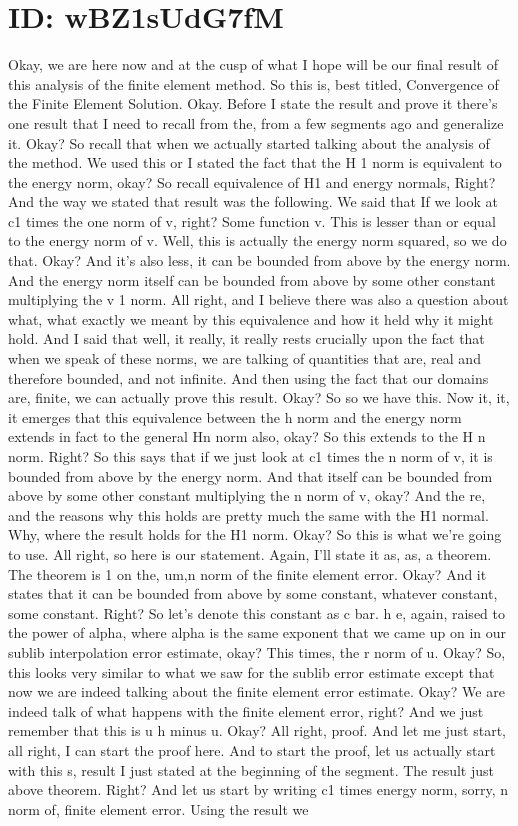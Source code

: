 \documentclass[10pt]{article}
\begin{document}
{\section*{ID: wBZ1sUdG7fM}
Okay, we are here now and at the cusp of what I hope will be our final result of this analysis of the finite element method. So this is, best titled, Convergence of the Finite Element Solution. Okay. Before I state the result and prove it there's one result that I need to recall from the, from a few segments ago and generalize it. Okay? So recall that when we actually started talking about the analysis of the method. We used this or I stated the fact that the H 1 norm is equivalent to the energy norm, okay? So recall equivalence of H1 and energy normals, Right? And the way we stated that result was the following. We said that If we look at c1 times the one norm of v, right? Some function v. This is lesser than or equal to the energy norm of v. Well, this is actually the energy norm squared, so we do that. Okay? And it's also less, it can be bounded from above by the energy norm. And the energy norm itself can be bounded from above by some other constant multiplying the v 1 norm. All right, and I believe there was also a question about what, what exactly we meant by this equivalence and how it held why it might hold. And I said that well, it really, it really rests crucially upon the fact that when we speak of these norms, we are talking of quantities that are, real and therefore bounded, and not infinite. And then using the fact that our domains are, finite, we can actually prove this result. Okay? So so we have this. Now it, it, it emerges that this equivalence between the h norm and the energy norm extends in fact to the general Hn norm also, okay? So this extends to the H n norm. Right? So this says that if we just look at c1 times the n norm of v, it is bounded from above by the energy norm. And that itself can be bounded from above by some other constant multiplying the n norm of v, okay? And the re, and the reasons why this holds are pretty much the same with the H1 normal. Why, where the result holds for the H1 norm. Okay? So this is what we're going to use. All right, so here is our statement. Again, I'll state it as, as, a theorem. The theorem is 1 on the, um,n norm of the finite element error. Okay? And it states that it can be bounded from above by some constant, whatever constant, some constant. Right? So let's denote this constant as c bar. h e, again, raised to the power of alpha, where alpha is the same exponent that we came up on in our sublib interpolation error estimate, okay? This times, the r norm of u. Okay? So, this looks very similar to what we saw for the sublib error estimate except that now we are indeed talking about the finite element error estimate. Okay? We are indeed talk of what happens with the finite element error, right? And we just remember that this is u h minus u. Okay? All right, proof. And let me just start, all right, I can start the proof here. And to start the proof, let us actually start with this s, result I just stated at the beginning of the segment. The result just above theorem. Right? And let us start by writing c1 times energy norm, sorry, n norm of, finite element error. Using the result we }
\end{document}
